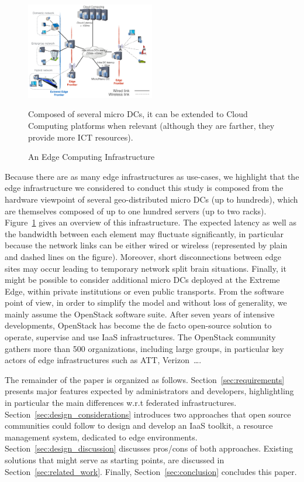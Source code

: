 \begin{figure}[]
  \centering
  \includegraphics[width=0.5\textwidth]{./figures/figure_fog.pdf}
  \caption{An Edge Computing Infrastructure~\cite{7923796}}
  \label{fig:fogedge-archi}
  {\small{Composed of several micro DCs, it can be extended to Cloud Computing platforms when relevant (although they are farther, they provide more ICT resources).}}
\end{figure}

Because there are as many edge infrastructures as use-cases, we
highlight that the edge infrastructure we considered to conduct this
study is composed from the hardware viewpoint of several
geo-distributed micro DCs (up to hundreds), which are themselves
composed of up to one hundred servers (up to two racks).
Figure~\ref{fig:fogedge-archi} gives an overview of this
infrastructure. The expected latency as well as the bandwidth between
each element may fluctuate significantly, in particular because the
network links can be either wired or wireless (represented by plain
and dashed lines on the figure). Moreover, short disconnections
between edge sites may occur leading to temporary network split brain
situations.  Finally, it might be possible
to consider additional micro DCs deployed at the Extreme Edge, within
private institutions or even public transports.
%
From the software point of view, in order to simplify the model and
without loss of generality, we mainly assume the OpenStack software
suite.  After seven years of intensive developments, OpenStack has
become the de facto open-source solution to operate, supervise and use
IaaS infrastructures.  The OpenStack community gathers more than 500
organizations, including large groups, in particular key actors of
edge infrastructures such as ATT, Verizon~\ldots.


The remainder of the paper is organized as
follows. Section~\ref{sec:requirements} presents major features
expected by administrators and developers, highlightling in particular
the main differences w.r.t federated infrastructures.
Section~\ref{sec:design_considerations} introduces two approaches that
open source communities could follow to design and develop an IaaS
toolkit, \aka a resource management system, dedicated to edge
environments. Section~\ref{sec:design_discussion} discusses pros/cons
of both approaches. Existing solutions that might serve as starting
points, are discussed in Section~\ref{sec:related_work}. Finally,
Section~\ref{sec:conclusion} concludes this paper.



